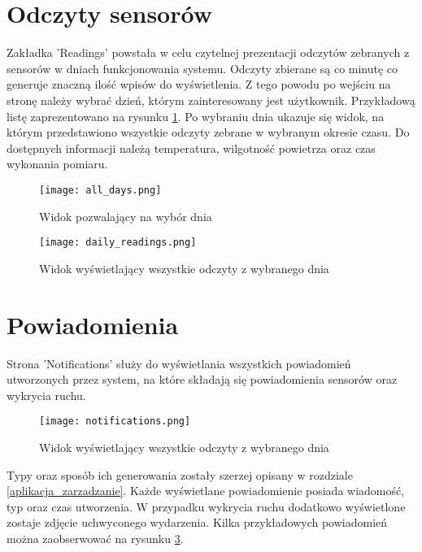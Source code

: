 \section{Odczyty sensorów}
Zakładka 'Readings' powstała w celu czytelnej prezentacji odczytów zebranych z sensorów w dniach funkcjonowania systemu. Odczyty zbierane są co minutę co generuje znaczną ilość wpisów do wyświetlenia. Z tego powodu po wejściu na stronę należy wybrać dzień, którym zainteresowany jest użytkownik. Przykładową listę zaprezentowano na rysunku \ref{fig:all_days}. Po wybraniu dnia ukazuje się widok, na którym przedstawiono wszystkie odczyty zebrane w wybranym okresie czasu. Do dostępnych informacji należą temperatura, wilgotność powietrza oraz czas wykonania pomiaru.
\begin{figure}[H]
	\centering
	\texttt{[image: all\_days.png]}
	\caption{Widok pozwalający na wybór dnia}
	\label{fig:all_days}
\end{figure}
\begin{figure}[H]
	\centering
	\texttt{[image: daily\_readings.png]}
	\caption{Widok wyświetlający wszystkie odczyty z wybranego dnia}
	\label{fig:daily_readings}
\end{figure}

\section{Powiadomienia} \label{notifications}
Strona 'Notifications' służy do wyświetlania wszystkich powiadomień utworzonych przez system, na które składają się powiadomienia sensorów oraz wykrycia ruchu.
\begin{figure}[H]
	\centering
	\texttt{[image: notifications.png]}
	\caption{Widok wyświetlający wszystkie odczyty z wybranego dnia}
	\label{fig:notifications}
\end{figure}
 Typy oraz sposób ich generowania zostały szerzej opisany w rozdziale \ref{aplikacja_zarzadzanie}. Każde wyświetlane powiadomienie posiada wiadomość, typ oraz czas utworzenia. W przypadku wykrycia ruchu dodatkowo wyświetlone zostaje zdjęcie uchwyconego wydarzenia. Kilka przykładowych powiadomień można zaobserwować na rysunku \ref{fig:notifications}.
 
